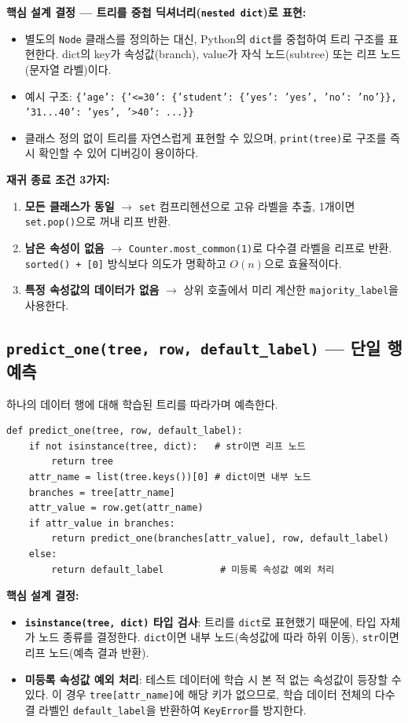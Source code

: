 \documentclass[12pt, a4paper]{article}
\begin{document}
\noindent\textbf{핵심 설계 결정 --- 트리를 중첩 딕셔너리(\texttt{nested dict})로 표현:}
\begin{itemize}
    \item 별도의 \texttt{Node} 클래스를 정의하는 대신, Python의 \texttt{dict}를 중첩하여 트리 구조를 표현한다. dict의 key가 속성값(branch), value가 자식 노드(subtree) 또는 리프 노드(문자열 라벨)이다.
    \item 예시 구조: \texttt{\{'age': \{'<=30': \{'student': \{'yes': 'yes', 'no': 'no'\}\}, '31...40': 'yes', '>40': ...\}\}}
    \item 클래스 정의 없이 트리를 자연스럽게 표현할 수 있으며, \texttt{print(tree)}로 구조를 즉시 확인할 수 있어 디버깅이 용이하다.
\end{itemize}

\noindent\textbf{재귀 종료 조건 3가지:}
\begin{enumerate}
    \item \textbf{모든 클래스가 동일} $\to$ \texttt{set} 컴프리헨션으로 고유 라벨을 추출, 1개이면 \texttt{set.pop()}으로 꺼내 리프 반환.
    \item \textbf{남은 속성이 없음} $\to$ \texttt{Counter.most\_common(1)}로 다수결 라벨을 리프로 반환. \texttt{sorted() + [0]} 방식보다 의도가 명확하고 $O(n)$으로 효율적이다.
    \item \textbf{특정 속성값의 데이터가 없음} $\to$ 상위 호출에서 미리 계산한 \texttt{majority\_label}을 사용한다.
\end{enumerate}


\subsection{\texttt{predict\_one(tree, row, default\_label)} --- 단일 행 예측}

하나의 데이터 행에 대해 학습된 트리를 따라가며 예측한다.

\begin{verbatim}
def predict_one(tree, row, default_label):
    if not isinstance(tree, dict):   # str이면 리프 노드
        return tree
    attr_name = list(tree.keys())[0] # dict이면 내부 노드
    branches = tree[attr_name]
    attr_value = row.get(attr_name)
    if attr_value in branches:
        return predict_one(branches[attr_value], row, default_label)
    else:
        return default_label          # 미등록 속성값 예외 처리
\end{verbatim}

\noindent\textbf{핵심 설계 결정:}
\begin{itemize}
    \item \textbf{\texttt{isinstance(tree, dict)} 타입 검사}: 트리를 \texttt{dict}로 표현했기 때문에, 타입 자체가 노드 종류를 결정한다. \texttt{dict}이면 내부 노드(속성값에 따라 하위 이동), \texttt{str}이면 리프 노드(예측 결과 반환).
    \item \textbf{미등록 속성값 예외 처리}: 테스트 데이터에 학습 시 본 적 없는 속성값이 등장할 수 있다. 이 경우 \texttt{tree[attr\_name]}에 해당 키가 없으므로, 학습 데이터 전체의 다수결 라벨인 \texttt{default\_label}을 반환하여 \texttt{KeyError}를 방지한다.
\end{itemize}
\end{document}
